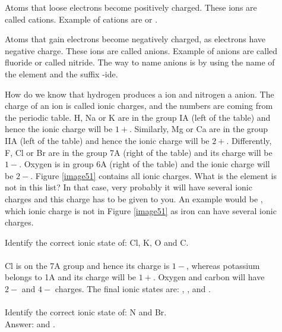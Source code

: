 \documentclass[main.tex]{subfiles}
\begin{document}
\begin{description}
\item[] Atoms that loose electrons become positively charged. These ions are called cations. Example of cations are  or .
\item[] Atoms that gain electrons become negatively charged, as electrons have negative charge. These ions are called anions. Example of anions are   called fluoride or  called nitride. The way to name anions is by using the name of the element and the suffix -ide.
\item[] How do we know that hydrogen produces a  ion and nitrogen a  anion. The charge of an ion is called ionic charges, and the numbers are coming from the periodic table. H, Na or K are in the group IA (left of the table) and hence the ionic charge will be $1+$.  Similarly, Mg or Ca are in the group IIA (left of the table) and hence the ionic charge will be $2+$. Differently, F, Cl or Br are in the group 7A (right of the table) and its charge will be $1-$. Oxygen is in group 6A (right of the table) and the ionic charge will be $2-$. Figure \ref{image51} contains all ionic charges. What is the element is not in this list? In that case, very probably it will have several ionic charges and this charge has to be given to you. An example would be , which ionic charge is not in Figure \ref{image51}  as iron can have several ionic charges.
\begin{example} %
Identify the correct ionic state of: Cl, K, O and C. \\
\\
Cl is on the 7A group and hence its charge is $1-$, whereas potassium belongs to 1A and its charge will be $1+$. Oxygen and carbon will have $2-$ and $4-$ charges. The final ionic states are: , ,  and .
\\
\faDiamond\ \\
Identify the correct ionic state of: N and Br.\\
\flushright Answer:  and .
\end{example}%
\end{description}
\end{document}
